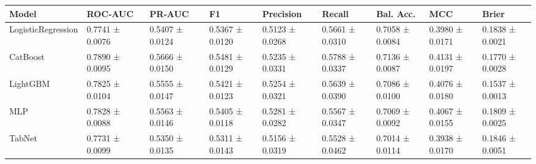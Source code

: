 \begin{tabular}{lllllllll}
\toprule
Model & ROC‑AUC & PR‑AUC & F1 & Precision & Recall & Bal. Acc. & MCC & Brier \\
\midrule
LogisticRegression & 0.7741 ± 0.0076 & 0.5407 ± 0.0124 & 0.5367 ± 0.0120 & 0.5123 ± 0.0268 & 0.5661 ± 0.0310 & 0.7058 ± 0.0084 & 0.3980 ± 0.0171 & 0.1838 ± 0.0021 \\
CatBoost & 0.7890 ± 0.0095 & 0.5666 ± 0.0150 & 0.5481 ± 0.0129 & 0.5235 ± 0.0331 & 0.5788 ± 0.0337 & 0.7136 ± 0.0087 & 0.4131 ± 0.0197 & 0.1770 ± 0.0028 \\
LightGBM & 0.7825 ± 0.0104 & 0.5555 ± 0.0147 & 0.5421 ± 0.0123 & 0.5254 ± 0.0321 & 0.5639 ± 0.0390 & 0.7086 ± 0.0100 & 0.4076 ± 0.0180 & 0.1537 ± 0.0013 \\
MLP & 0.7828 ± 0.0088 & 0.5563 ± 0.0146 & 0.5405 ± 0.0118 & 0.5281 ± 0.0282 & 0.5567 ± 0.0347 & 0.7069 ± 0.0092 & 0.4067 ± 0.0155 & 0.1809 ± 0.0025 \\
TabNet & 0.7731 ± 0.0099 & 0.5350 ± 0.0135 & 0.5311 ± 0.0143 & 0.5156 ± 0.0319 & 0.5528 ± 0.0462 & 0.7014 ± 0.0114 & 0.3938 ± 0.0170 & 0.1846 ± 0.0051 \\
\bottomrule
\end{tabular}
